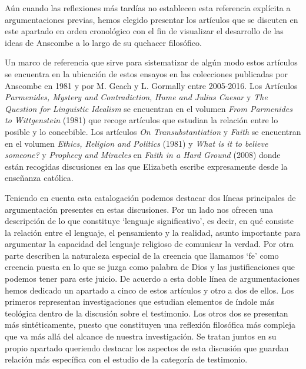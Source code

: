 Aún cuando las reflexiones más tardías no establecen esta referencia explícita a argumentaciones previas, hemos elegido presentar los artículos que se discuten en este apartado en orden cronológico con el fin de visualizar el desarrollo de las ideas de Anscombe a lo largo de su quehacer filosófico. 

Un marco de referencia que sirve para sistematizar de algún modo estos artículos se encuentra en la ubicación de estos ensayos en las colecciones publicadas por Anscombe en 1981 y por M. Geach y L. Gormally entre 2005-2016. Los Artículos \emph{Parmenides, Mystery and Contradiction}, \emph{Hume and Julius Caesar} y \emph{The Question for Linguistic Idealism} se encuentran en el volumen \emph{From Parmenides to Wittgenstein} (1981) que recoge artículos que estudian la relación entre lo posible y lo concebible. Los artículos \emph{On Transubstantiation} y \emph{Faith} se encuentran en el volumen \emph{Ethics, Religion and Politics} (1981) y \emph{What is it to believe someone?} y \emph{Prophecy and Miracles} en \emph{Faith in a Hard Ground} (2008) donde están recogidas discusiones en las que Elizabeth escribe expresamente desde la enseñanza católica. 

Teniendo en cuenta esta catalogación podemos destacar dos líneas principales de argumentación presentes en estas discusiones. Por un lado nos ofrecen una descripción de lo que constituye `lenguaje significativo', es decir, en qué consiste la relación entre el lenguaje, el pensamiento y la realidad, asunto importante para argumentar la capacidad del lenguaje religioso de comunicar la verdad. Por otra parte describen la naturaleza especial de la creencia que llamamos `fe' como creencia puesta en lo que se juzga como palabra de Dios y las justificaciones que podemos tener para este juicio. De acuerdo a esta doble línea de argumentaciones hemos dedicado un apartado a cinco de estos artículos y otro a dos de ellos. Los primeros representan investigaciones que estudian elementos de índole más teológica dentro de la discusión sobre el testimonio. Los otros dos se presentan más sintéticamente, puesto que constituyen una reflexión filosófica más compleja que va más allá del alcance de nuestra investigación. Se tratan juntos en su propio apartado queriendo destacar los aspectos de esta discusión que guardan relación más específica con el estudio de la categoría de testimonio.
